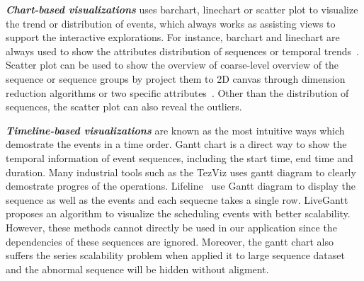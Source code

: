 \emph{\textbf{Chart-based visualizations}} uses barchart, linechart or scatter plot to visualize the trend or distribution of events, which always works as assisting views to support the interactive explorations. For instance, barchart and linechart are always used to show the attributes distribution of sequences or temporal trends~\cite{gotz2019visual, cappers2017exploring}. Scatter plot can be used to show the overview of coarse-level overview of the sequence or sequence groups by project them to 2D canvas through dimension reduction algorithms or two specific attributes~\cite{wu2020visual, malik2016high, gotz2019visual}. Other than the  distribution of sequences, the scatter plot can also reveal the outliers. 

\emph{\textbf{Timeline-based visualizations}} are known as the most intuitive ways which demostrate the events in a time order. Gantt chart is a direct way to show the temporal information of event sequences, including the start time, end time and duration. Many industrial tools such as the TezViz uses gantt diagram to clearly demostrate progres of the operations. Lifeline~\cite{plaisant1996lifelines} use Gantt diagram to display the sequence as well as the events and each sequecne takes a single row. LiveGantt~\cite{jo2014livegantt} proposes an algorithm to visualize the scheduling events with better scalability. However, these methods cannot directly be used in our application since the dependencies of these sequences are ignored. Moreover, the gantt chart also suffers the series scalability problem when applied it to large sequence dataset and the abnormal sequence will be hidden without aligment.
